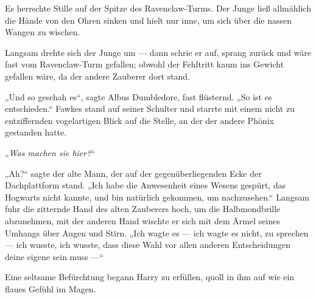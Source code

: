 Es herrschte Stille auf der Spitze des Ravenclaw-Turms. Der Junge ließ allmählich die Hände von den Ohren sinken und hielt nur inne, um sich über die nassen Wangen zu wischen.

Langsam drehte sich der Junge um — dann schrie er auf, sprang zurück und wäre fast vom Ravenclaw-Turm gefallen; obwohl der Fehltritt kaum ins Gewicht gefallen wäre, da der andere Zauberer dort stand.

„Und so geschah es“, sagte Albus Dumbledore, fast flüsternd.
„So ist es entschieden.“
Fawkes stand auf seiner Schulter und starrte mit einem nicht zu entziffernden vogelartigen Blick auf die Stelle, an der der andere Phönix gestanden hatte.

„\emph{Was machen sie hier?}“

„Ah?“ sagte der alte Mann, der auf der gegenüberliegenden Ecke der Dachplattform stand.
„Ich habe die Anwesenheit eines Wesens gespürt, das Hogwarts nicht kannte, und bin natürlich gekommen, um nachzusehen.“
Langsam fuhr die zitternde Hand des alten Zauberers hoch, um die Halbmondbrille abzunehmen, mit der anderen Hand wischte er sich mit dem Ärmel seines Umhangs über Augen und Stirn.
„Ich wagte es — ich wagte es nicht, zu sprechen — ich wusste, ich wusste, dass diese Wahl vor allen anderen Entscheidungen deine eigene sein muss —“

Eine seltsame Befürchtung begann Harry zu erfüllen, quoll in ihm auf wie ein flaues Gefühl im Magen.

